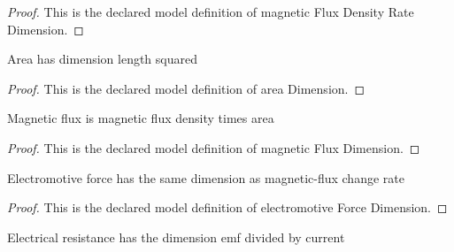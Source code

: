\begin{proof}
  This is the declared model definition of magnetic Flux Density Rate Dimension.
\end{proof}
\begin{definition}
  \label{def:physics:phyx-mini-0930:phyxminiproblems-problemphyxmini0930-areadimension}
  Area has dimension length squared
\end{definition}
\begin{proof}
  This is the declared model definition of area Dimension.
\end{proof}
\begin{definition}
  \label{def:physics:phyx-mini-0930:phyxminiproblems-problemphyxmini0930-magneticfluxdimension}
  Magnetic flux is magnetic flux density times area
\end{definition}
\begin{proof}
  This is the declared model definition of magnetic Flux Dimension.
\end{proof}
\begin{definition}
  \label{def:physics:phyx-mini-0930:phyxminiproblems-problemphyxmini0930-electromotiveforcedimension}
  Electromotive force has the same dimension as magnetic-flux change rate
\end{definition}
\begin{proof}
  This is the declared model definition of electromotive Force Dimension.
\end{proof}
\begin{definition}
  \label{def:physics:phyx-mini-0930:phyxminiproblems-problemphyxmini0930-electricalresistancedimension}
  Electrical resistance has the dimension emf divided by current
\end{definition}

